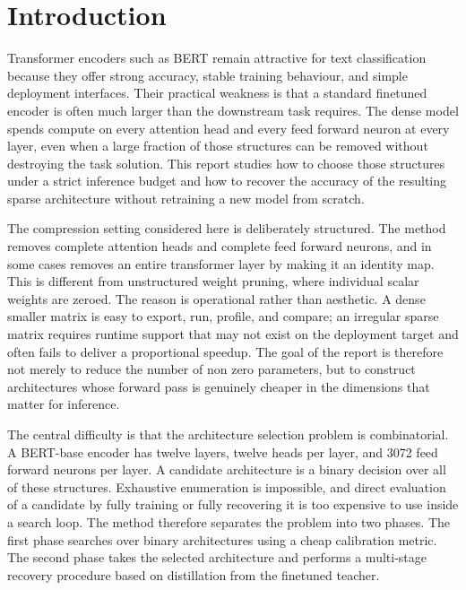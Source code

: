 \section{Introduction}
\label{sec:introduction}

Transformer encoders such as BERT remain attractive for text classification because they offer strong accuracy, stable training behaviour, and simple deployment interfaces. Their practical weakness is that a standard finetuned encoder is often much larger than the downstream task requires. The dense model spends compute on every attention head and every feed forward neuron at every layer, even when a large fraction of those structures can be removed without destroying the task solution. This report studies how to choose those structures under a strict inference budget and how to recover the accuracy of the resulting sparse architecture without retraining a new model from scratch.

The compression setting considered here is deliberately structured. The method removes complete attention heads and complete feed forward neurons, and in some cases removes an entire transformer layer by making it an identity map. This is different from unstructured weight pruning, where individual scalar weights are zeroed. The reason is operational rather than aesthetic. A dense smaller matrix is easy to export, run, profile, and compare; an irregular sparse matrix requires runtime support that may not exist on the deployment target and often fails to deliver a proportional speedup. The goal of the report is therefore not merely to reduce the number of non zero parameters, but to construct architectures whose forward pass is genuinely cheaper in the dimensions that matter for inference.

The central difficulty is that the architecture selection problem is combinatorial. A BERT-base encoder has twelve layers, twelve heads per layer, and 3072 feed forward neurons per layer. A candidate architecture is a binary decision over all of these structures. Exhaustive enumeration is impossible, and direct evaluation of a candidate by fully training or fully recovering it is too expensive to use inside a search loop. The method therefore separates the problem into two phases. The first phase searches over binary architectures using a cheap calibration metric. The second phase takes the selected architecture and performs a multi-stage recovery procedure based on distillation from the finetuned teacher.

